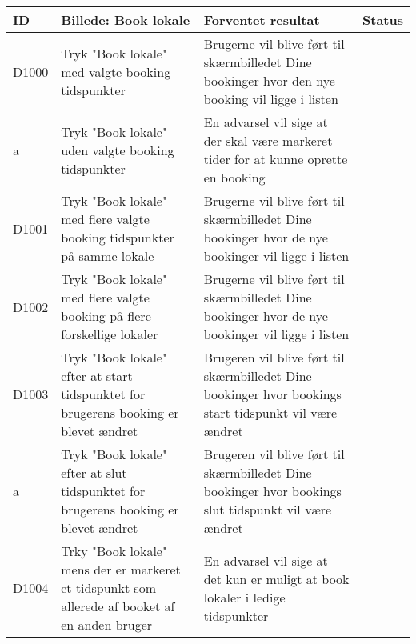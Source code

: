 \begin{tabularx}{\textwidth}{ |X|X|X|X| }
\hline
	ID & Billede: Book lokale  & Forventet resultat & Status\\ 
\hline
	D1000 & Tryk "Book lokale" med valgte booking tidspunkter & Brugerne vil blive ført til skærmbilledet Dine bookinger hvor den nye booking vil ligge i listen & \\
\hline
	a & Tryk "Book lokale" uden valgte booking tidspunkter & En advarsel vil sige at der skal være markeret tider for at kunne oprette en booking & \\
\hline
	D1001 & Tryk "Book lokale" med flere valgte booking tidspunkter på samme lokale &  Brugerne vil blive ført til skærmbilledet Dine bookinger hvor de nye bookinger vil ligge i listen & \\
\hline
	D1002 & Tryk "Book lokale" med flere valgte booking på flere forskellige lokaler&  Brugerne vil blive ført til skærmbilledet Dine bookinger hvor de nye bookinger vil ligge i listen & \\
\hline
	D1003 & Tryk "Book lokale" efter at start tidspunktet for brugerens booking er blevet ændret & Brugeren vil blive ført til skærmbilledet Dine bookinger hvor bookings start tidspunkt vil være ændret & \\
\hline
	a & Tryk "Book lokale" efter at slut tidspunktet for brugerens booking er blevet ændret & Brugeren vil blive ført til skærmbilledet Dine bookinger hvor bookings slut tidspunkt vil være ændret & \\
\hline
	D1004 & Trky "Book lokale" mens der er markeret et tidspunkt som allerede af booket af en anden bruger & En advarsel vil sige at det kun er muligt at book lokaler i ledige tidspunkter & \\
\hline
\end{tabularx}

